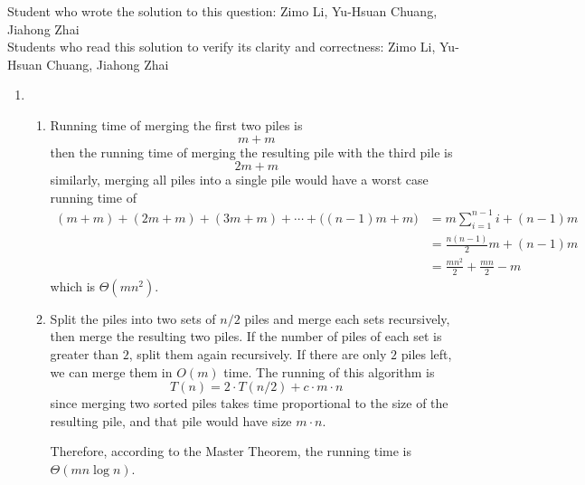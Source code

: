 \documentclass{article}
\author{Zimo Li}
\begin{document}
\noindent Student who wrote the solution to this question: Zimo Li, Yu-Hsuan Chuang, Jiahong Zhai\\
Students who read this solution to verify its clarity and correctness: Zimo Li, Yu-Hsuan Chuang, Jiahong Zhai\\

\begin{enumerate}
    \item
    \begin{enumerate}
        \item
        Running time of merging the first two piles is\[m+m\]
        then the running time of merging the resulting pile with the third pile is\[2m+m\]
        similarly, merging all piles into a single pile would have a worst case running time of
        \begin{align*}
            (m+m)+(2m+m)+(3m+m)+\cdots+\Big((n-1)m+m\Big) &= m\sum_{i=1}^{n-1}i+(n-1)m\\
            &= \frac{n(n-1)}{2}m+(n-1)m\\
            &=\frac{mn^2}{2} + \frac{mn}{2}-m
        \end{align*}
        which is $\Theta(mn^2)$.\\

        \item Split the piles into two sets of $n/2$ piles and merge each sets recursively, then merge the resulting two piles. If the number of piles of each set is greater than $2$, split them again recursively. If there are only $2$ piles left, we can merge them in $O(m)$ time. The running of this algorithm is
        \[T(n)=2\cdot T(n/2)+c\cdot m\cdot n\]
        since merging two sorted piles takes time proportional to the size of the resulting pile, and that pile would have size $m\cdot n$.

        Therefore, according to the Master Theorem, the running time is $\Theta(mn\log{n})$.
    \end{enumerate}


\end{enumerate}
\end{document}

